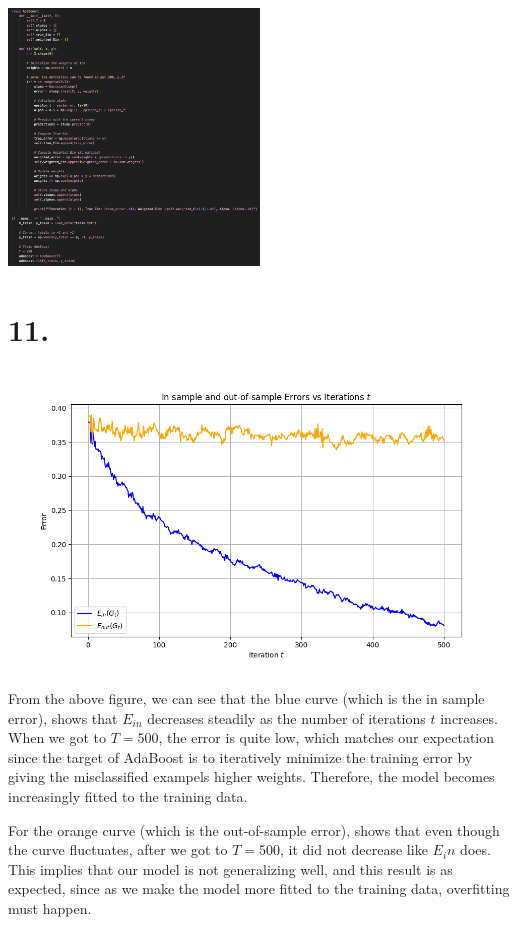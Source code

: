 \documentclass{article}
\begin{document}
\includegraphics[width = 0.5\textwidth, keepaspectratio]{10_v6_snapshot_2.png}


\newpage

\section*{11.}

\includegraphics[width = \textwidth, height = \textheight, keepaspectratio]{11_result_1112.png}

From the above figure, we can see that 
the blue curve (which is the in sample error), shows that $E_{in}$ decreases steadily as the number of iterations $t$ increases.
When we got to $T = 500$, the error is quite low, which matches our expectation since
the target of AdaBoost is to iteratively minimize the training error by giving the misclassified exampels higher weights.
Therefore, the model becomes increasingly fitted to the training data.
\newline

For the orange curve (which is the out-of-sample error), shows that even though the curve fluctuates,
after we got to $T = 500$, it did not decrease like $E_in$ does. 
This implies that our model is not generalizing well, and this result is as expected,
since as we make the model more fitted to the training data, overfitting must happen.
\end{document}
